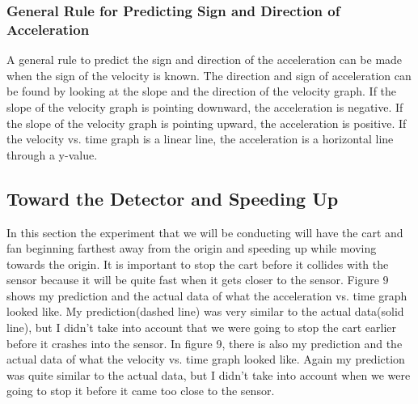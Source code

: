 \documentclass[aps,letterpaper,11pt]{revtex4}
\begin{document}
\subsubsection{General Rule for Predicting Sign and Direction of Acceleration}

A general rule to predict the sign and direction of the acceleration can be made when the sign of the velocity is known. The direction and sign of acceleration can be found by looking at the slope and the direction of the velocity graph. If the slope of the velocity graph is pointing downward, the acceleration is negative. If the slope of the velocity graph is pointing upward, the acceleration is positive. If the velocity vs. time graph is a linear line, the acceleration is a horizontal line through a y-value. 


\subsection{Toward the Detector and Speeding Up}

In this section the experiment that we will be conducting will have the cart and fan beginning farthest away from the origin and speeding up while moving towards the origin. It is important to stop the cart before it collides with the sensor because it will be quite fast when it gets closer to the sensor. Figure 9 shows my prediction and the actual data of what the acceleration vs. time graph looked like. My prediction(dashed line) was very similar to the actual data(solid line), but I didn't take into account that we were going to stop the cart earlier before it crashes into the sensor. In figure 9, there is also my prediction and the actual data of what the velocity vs. time graph looked like. Again my prediction was quite similar to the actual data, but I didn't take into account when we were going to stop it before it came too close to the sensor.
\end{document}
